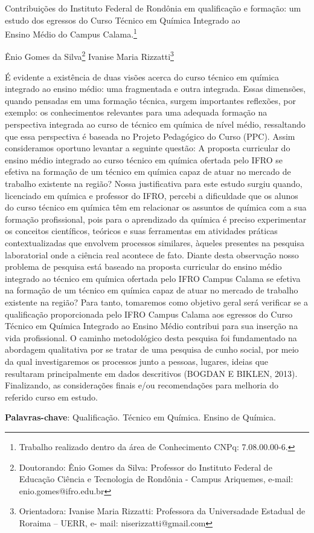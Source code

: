 \documentclass[article,12pt,onesidea,4paper,english,brazil]{abntex2}
\begin{document}
	
	
	\frenchspacing 
	
	\begin{center}
		\LARGE Contribuições do Instituto Federal de Rondônia em qualificação e formação:
		um estudo dos egressos do Curso Técnico em Química Integrado ao\\Ensino Médio do Campus Calama.\footnote{Trabalho realizado dentro da área de Conhecimento CNPq: 7.08.00.00-6.}
		
		\normalsize
		Ênio Gomes da Silva\footnote{Doutorando: Ênio Gomes da Silva: Professor do Instituto Federal de Educação Ciência e Tecnologia de Rondônia - Campus Ariquemes, e-mail: enio.gomes@ifro.edu.br} 
		Ivanise Maria Rizzatti\footnote{Orientadora: Ivanise Maria Rizzatti: Professora da Universadade Estadual de Roraima – UERR, e-
			mail: niserizzatti@gmail.com} 
	\end{center}
	
	\noindent É evidente a existência de duas visões acerca do curso técnico em química integrado ao
	ensino médio: uma fragmentada e outra integrada. Essas dimensões, quando pensadas em
	uma formação técnica, surgem importantes reflexões, por exemplo: os conhecimentos
	relevantes para uma adequada formação na perspectiva integrada ao curso de técnico em
	química de nível médio, ressaltando que essa perspectiva é baseada no Projeto Pedagógico
	do Curso (PPC). Assim consideramos oportuno levantar a seguinte questão: A proposta
	curricular do ensino médio integrado ao curso técnico em química ofertada pelo IFRO se
	efetiva na formação de um técnico em química capaz de atuar no mercado de trabalho
	existente na região? Nossa justificativa para este estudo surgiu quando, licenciado em
	química e professor do IFRO, percebi a dificuldade que os alunos do curso técnico em
	química têm em relacionar os assuntos de química com a sua formação profissional, pois
	para o aprendizado da química é preciso experimentar os conceitos científicos, teóricos e
	suas ferramentas em atividades práticas contextualizadas que envolvem processos
	similares, àqueles presentes na pesquisa laboratorial onde a ciência real acontece de fato.
	Diante desta observação nosso problema de pesquisa está baseado na proposta curricular
	do ensino médio integrado ao técnico em química ofertada pelo IFRO Campus Calama se
	efetiva na formação de um técnico em química capaz de atuar no mercado de trabalho
	existente na região? Para tanto, tomaremos como objetivo geral será verificar se a
	qualificação proporcionada pelo IFRO Campus Calama aos egressos do Curso Técnico em
	Química Integrado ao Ensino Médio contribui para sua inserção na vida profissional. O
	caminho metodológico desta pesquisa foi fundamentado na abordagem qualitativa por se
	tratar de uma pesquisa de cunho social, por meio da qual investigaremos os processos junto
	a pessoas, lugares, ideias que resultaram principalmente em dados descritivos (BOGDAN E
	BIKLEN, 2013). Finalizando, as considerações finais e/ou recomendações para melhoria do
	referido curso em estudo.
	
	\vspace{\onelineskip}
	
	\noindent
	\textbf{Palavras-chave}: Qualificação. Técnico em Química. Ensino de Química.
	
\end{document}
